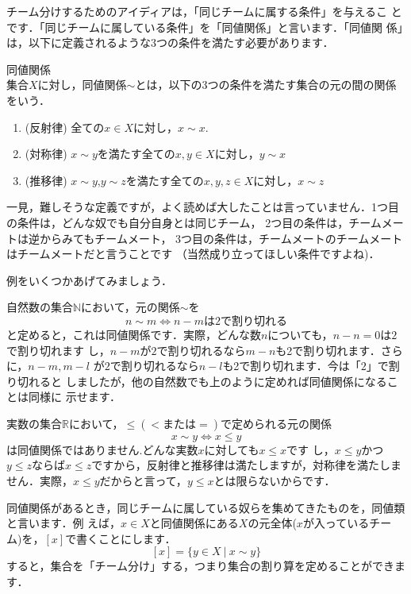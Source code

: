 チーム分けするためのアイディアは，「同じチームに属する条件」を与えるこ
とです．「同じチームに属している条件」を「同値関係」と言います．「同値関
係」は，以下に定義されるような3つの条件を満たす必要があります．

\begin{defi}同値関係\\
 集合$X$に対し，同値関係$\sim$とは，以下の3つの条件を満たす集合の元の間の関係をいう．
 \begin{enumerate}
  \item(反射律) 全ての$x\in X$に対し，$x \sim x.$
  \item(対称律)  $x\sim y$を満たす全ての$x,y\in X$に対し，$y\sim x$
  \item(推移律) $x\sim y$,$y\sim z$を満たす全ての$x,y,z\in X$に対し，$x\sim
	z$
 \end{enumerate}
\end{defi}
一見，難しそうな定義ですが，よく読めば大したことは言っていません．1つ目の条件は，どんな奴でも自分自身とは同じチーム，
2つ目の条件は，チームメートは逆からみてもチームメート，
3つ目の条件は，チームメートのチームメートはチームメートだと言うことです
（当然成り立ってほしい条件ですよね)．


例をいくつかあげてみましょう．
\begin{ex}
 自然数の集合$\mathbb{N}$において，元の関係$\sim$を
 \[
  n\sim m\Leftrightarrow n-mは2で割り切れる
 \]
 と定めると，これは同値関係です．実際，どんな数$n$についても，$n-n=0$は$2$で割り切れます
 し，$n-m$が$2$で割り切れるなら$m-n$も2で割り切れます．さらに，$n-m,m-l$
 が$2$で割り切れるなら$n-l$も2で割り切れます．今は「$2$」で割り切れると
 しましたが，他の自然数でも上のように定めれば同値関係になることは同様に
 示せます．
\end{ex}


\begin{ex}
 実数の集合$\mathbb{R}$において，$\leq(<または=)$で定められる元の関係
 \[
  x\sim y\Leftrightarrow x\leq y
 \]
 は同値関係ではありません.どんな実数$x$に対しても$x\leq x$です
 し，$x\leq y$かつ$y \leq z$ならば$x\leq z$ですから，反射律と推移律は満たしますが，対称律を満たしま
 せん．実際，$x\leq y$だからと言って，$y\leq x$とは限らないからです．
\end{ex}

同値関係があるとき，同じチームに属している奴らを集めてきたものを，同値類と言います．例
えば，$x\in X$と同値関係にある$X$の元全体($x$が入っているチーム)を，$[x]$で書くことにします．
\[
 [x]=\{y\in X\ |\ x\sim y\}
\]
すると，集合を「チーム分け」する，つまり集合の割り算を定めることができま
す．

